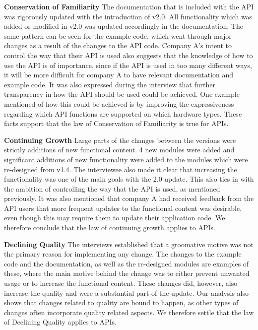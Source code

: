 \documentclass{sig-alternate}
\begin{document}
\smallskip \noindent
\textbf{Conservation of Familiarity  } 
The documentation that is included with the API was rigorously updated with the introduction of v2.0. All functionality which was added or modified in v2.0 was updated accordingly in the documentation. The same pattern can be seen for the example code, which went through major changes as a result of the changes to the API code. Company A's intent to control the way that their API is used also suggests that the knowledge of how to use the API is of importance, since if the API is used in too many different ways, it will be more difficult for company A to have relevant documentation and example code. It was also expressed during the interview that further transparency in how the API should be used could be achieved. One example mentioned of how this could be achieved is by improving the expressiveness regarding which API functions are supported on which hardware types. These facts support that the law of Conservation of Familiarity is true for APIs. 

\smallskip \noindent
\textbf{Continuing Growth  } 
Large parts of the changes between the versions were strictly additions of new functional content. 4 new modules were added and significant additions of new functionality were added to the modules which were re-designed from v1.4. The interviewee also made it clear that increasing the functionality was one of the main goals with the 2.0 update. This also ties in with the ambition of controlling the way that the API is used, as mentioned previously. It was also mentioned that company A had received feedback from the API users that more frequent updates to the functional content was desirable, even though this may require them to update their application code. We therefore conclude that the law of continuing growth applies to APIs. 

\smallskip \noindent
\textbf{Declining Quality  } 
The interviews established that a groomative motive was not the primary reason for implementing any change. The changes to the example code and the documentation, as well as the re-designed modules are examples of these, where the main motive behind the change was to either prevent unwanted usage or to increase the functional content. These changes did, however, also increase the quality and were a substantial part of the update. Our analysis also shows that changes related to quality are bound to happen, as other types of changes often incorporate quality related aspects. We therefore settle that the law of Declining Quality applies to APIs. 
\end{document}
